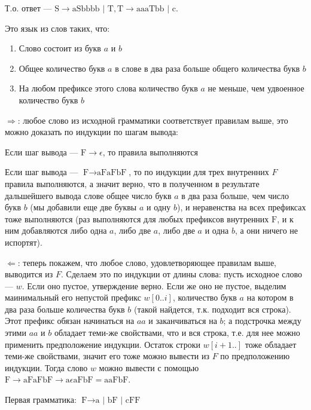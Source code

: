 \documentclass[12pt,a4paper]{scrartcl}
\begin{document}
\begin{description}
	Т.о. ответ --- $\text{S} \rightarrow \text{aSbbbb | T}, \text{T} \rightarrow \text{aaaTbb | c}$.
	
	
	\item[\fbox{3.}] Это язык из слов таких, что:
	
	\begin{enumerate}
		\item Слово состоит из букв $a$ и $b$
		\item Общее количество букв $a$ в слове в два раза больше общего количества букв $b$
		\item На любом префиксе этого слова количество букв $a$ не меньше, чем удвоенное количество букв $b$
	\end{enumerate}

	$\Rightarrow$: любое слово из исходной грамматики соответствует правилам выше, это можно доказать по индукции по шагам вывода:
	
	Если шаг вывода --- $\text{F} \rightarrow \epsilon$, то правила выполняются
	
	Если шаг вывода --- $\text{F} \rightarrow \text{aFaFbF}$, то по индукции для трех внутренних $F$ правила выполняются, а значит верно, что в полученном в результате дальшейшего вывода слове общее число букв $a$ в два раза больше, чем число букв $b$ (мы добавили еще две буквы $a$ и одну $b$), и неравенства на всех префиксах тоже выполняются (раз выполняются для любых префиксов внутренних $\text{F}$, и к ним добавляются либо одна $a$, либо две $a$, либо две $a$ и одна $b$, а они ничего не испортят).
	
	$\Leftarrow$: теперь покажем, что любое слово, удовлетворяющее правилам выше, выводится из $F$. Сделаем это по индукции от длины слова: пусть исходное слово --- $w$. Если оно пустое, утверждение верно. Если же оно не пустое, выделим маинимальный его непустой префикс $w[0..i]$, количество букв $a$ на котором в два раза больше количества букв $b$ (такой найдется, т.к. подходит вся строка). Этот префикс обязан начинаться на $aa$ и заканчиваться на $b$; а подстрочка между этими $aa$ и $b$ обладает теми-же свойствами, что и вся строка, т.е. для нее можно применить предположение индукции. Остаток строки $w[i+1..]$ тоже обладает теми-же свойствами, значит его тоже можно вывести из $F$ по предположению индукции. Тогда слово $w$ можно вывести с помощью $\text{F} \rightarrow \text{aFaFbF} \rightarrow \text{a}\epsilon\text{aFbF} = \text{aaFbF}$.
	
	
	\item[\fbox{4.}] Первая грамматика: $\text{F} \rightarrow \text{a | bF | cFF}$
	

\end{description}
\end{document}
